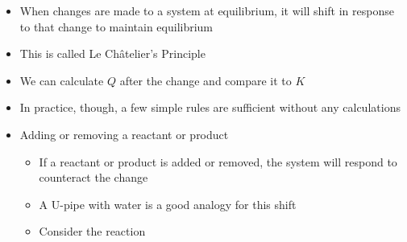 \documentclass[12pt, openany, letterpaper]{memoir}
\begin{document}
\begin{itemize}
	\item When changes are made to a system at equilibrium, it will shift in response to that change to maintain equilibrium
	\item This is called Le Ch\^atelier's Principle
	\item We can calculate $Q$ after the change and compare it to $K$
	\item In practice, though, a few simple rules are sufficient without any calculations
	\item Adding or removing a reactant or product
	\begin{itemize}
		\item If a reactant or product is added or removed, the system will respond to counteract the change
		\item A U-pipe with water is a good analogy for this shift
		\item Consider the reaction 
		

\end{itemize}
\end{itemize}
\end{document}
